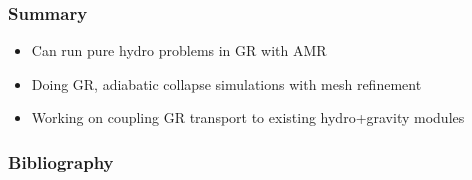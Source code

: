 \documentclass{beamer}
\begin{document}
\begin{frame}
\frametitle{Summary}

  \begin{itemize}
    \item
      Can run pure hydro problems in GR with AMR
    \item
      Doing GR, adiabatic collapse simulations with mesh refinement
    \item
      Working on coupling GR transport to existing hydro+gravity modules
  \end{itemize}

\end{frame}

\begin{frame}
\frametitle{Bibliography}

  

\end{frame}
\end{document}

